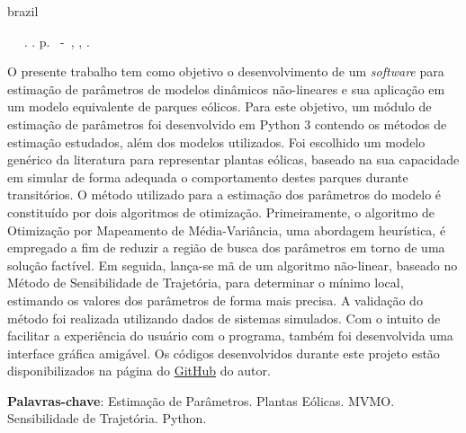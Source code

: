 \setlength{\absparsep}{18pt} %

\begin{resumo}[Resumo]

\begin{otherlanguage*}{brazil}

\begin{flushleft} 
	\setlength{\absparsep}{0pt} %
	\SingleSpacing 
	\imprimirautorabr~ ~\textbf{\imprimirtitleabstract}.	\imprimirdata. \pageref{LastPage}p. 
	\imprimirtipotrabalho~-~\imprimirinstituicao, \imprimirlocal, \imprimirdata. 
\end{flushleft}

\OnehalfSpacing

O presente trabalho tem como objetivo o desenvolvimento de um \textit{software} para estima\c{c}\~ao de par\^ametros de modelos din\^amicos n\~ao-lineares e sua aplica\c{c}\~ao em um modelo equivalente de parques e\'olicos. Para este objetivo, um m\'odulo de estima\c{c}\~ao de par\^ametros foi desenvolvido em Python 3 contendo os m\'etodos de estima\c{c}\~ao estudados, al\'em dos modelos utilizados. Foi escolhido um modelo gen\'erico da literatura para representar plantas e\'olicas, baseado na sua capacidade em simular de forma adequada o comportamento destes parques durante transit\'orios. O m\'etodo utilizado para a estima\c{c}\~ao dos par\^ametros do modelo \'e constitu\'ido por dois algoritmos de otimiza\c{c}\~ao. Primeiramente, o algoritmo de Otimiza\c{c}\~ao por Mapeamento de M\'edia-Vari\^ancia, uma abordagem heur\'istica, \'e empregado a fim de reduzir a regi\~ao de busca dos par\^ametros em torno de uma solu\c{c}\~ao fact\'ivel. Em seguida, lan\c{c}a-se m\~a de um algoritmo n\~ao-linear, baseado no M\'etodo de Sensibilidade de Trajet\'oria, para determinar o m\'inimo local, estimando os valores dos par\^ametros de forma mais precisa. A valida\c{c}\~ao do m\'etodo foi realizada utilizando dados de sistemas simulados. Com o intuito de facilitar a experi\^encia do usu\'ario com o programa, tamb\'em foi desenvolvida uma interface gr\'afica amig\'avel. Os c\'odigos desenvolvidos durante este projeto est\~ao disponibilizados na p\'agina do \href{https://github.com/gnegrelli}{GitHub} do autor.

\textbf{Palavras-chave}: Estima\c{c}\~ao de Par\^ametros. Plantas E\'olicas. MVMO. Sensibilidade de Trajet\'oria. Python.

\end{otherlanguage*}

\end{resumo}